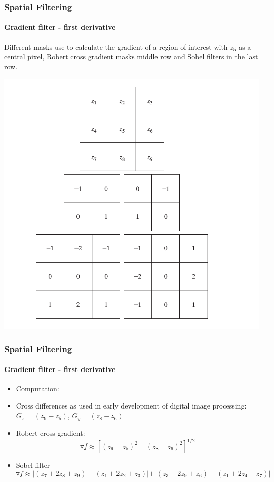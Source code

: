 \documentclass{beamer}
\begin{document}
\begin{frame}
\frametitle{Spatial Filtering}
\framesubtitle{Gradient filter - first derivative}
Different masks use to calculate the gradient of a region of interest with $z_{5}$ as a central pixel, Robert cross gradient masks middle row and  Sobel filters in the last row.
\begin{center}
\includegraphics[scale=0.26]{images/Spatial10-gradient.png}
\end{center}
\end{frame}
\begin{frame}
\frametitle{Spatial Filtering}
\framesubtitle{Gradient filter - first derivative}
\begin{itemize}
\item Computation:
\item Cross differences as used in early development of digital image processing: 
$G_x = (z_9 - z_5)$, \quad $ G_y = (z_8 - z_6)$
\item Robert cross gradient: 
$$ \triangledown f \approx [(z_9 - z_5)^2 + (z_8 - z_6)^2]^{1/2}$$
\item Sobel filter 
\scriptsize{
$$ \triangledown f \approx \vert (z_7 + 2 z_8 + z_9) - (z_1 + 2 z_2 + z_3) \vert + \vert (z_3 + 2 z_9 + z_6) - (z_1 + 2 z_4 + z_7) \vert$$
}
\end{itemize}

\end{frame}
\end{document}
